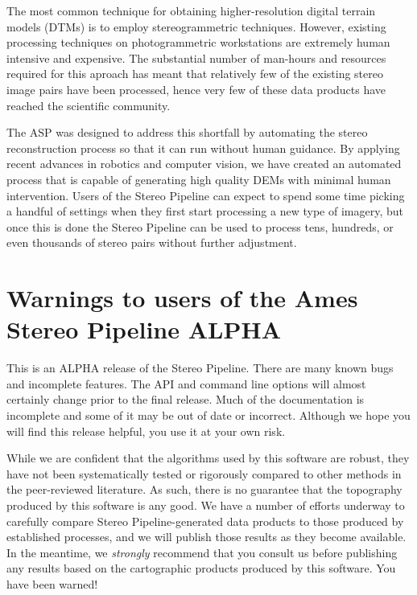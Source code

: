 The most common technique for obtaining higher-resolution digital
terrain models (DTMs) is to employ stereogrammetric techniques.
However, existing processing techniques on photogrammetric
workstations are extremely human intensive and expensive.  The
substantial number of man-hours and resources required for this
aproach has meant that relatively few of the existing stereo image
pairs have been processed, hence very few of these data products have
reached the scientiﬁc community.

The ASP was designed to address this shortfall by automating the
stereo reconstruction process so that it can run without human
guidance.  By applying recent advances in robotics and computer
vision, we have created an automated process that is capable of
generating high quality DEMs with minimal human intervention.  Users
of the Stereo Pipeline can expect to spend some time picking a handful
of settings when they first start processing a new type of imagery,
but once this is done the Stereo Pipeline can be used to process tens,
hundreds, or even thousands of stereo pairs without further
adjustment.

\section{Warnings to users of the Ames Stereo Pipeline ALPHA}

This is an ALPHA release of the Stereo Pipeline.  There are many
known bugs and incomplete features. The API and command line options
will almost certainly change prior to the final release.  Much of
the documentation is incomplete and some of it may be out of date
or incorrect.  Although we hope you will find this release helpful,
you use it at your own risk.

While we are confident that the algorithms used by this software are
robust, they have not been systematically tested or rigorously
compared to other methods in the peer-reviewed literature.  As such,
there is no guarantee that the topography produced by this software is
any good.  We have a number of efforts underway to carefully compare
Stereo Pipeline-generated data products to those produced by
established processes, and we will publish those results as they
become available.  In the meantime, we {\em strongly} recommend that
you consult us before publishing any results based on the cartographic
products produced by this software. You have been warned!



